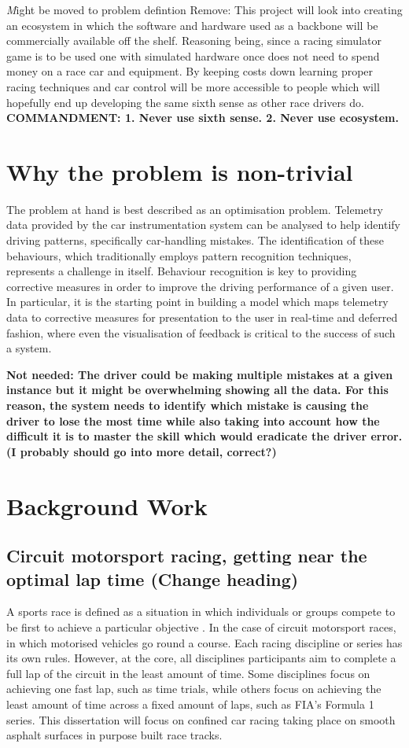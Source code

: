 \documentclass{article}
\begin{document}
\emph Might be moved to problem defintion {Remove: This project will look into creating an ecosystem in which the software and hardware used as a backbone will be commercially available off the shelf. Reasoning being, since a racing simulator game is to be used one with simulated hardware once does not need to spend money on a race car and equipment. By keeping costs down learning proper racing techniques and car control will be more accessible to people which will hopefully end up developing the same sixth sense as other race drivers do.} \textbf{COMMANDMENT: 1. Never use sixth sense. 2. Never use ecosystem.}

\section{Why the problem is non-trivial}
The problem at hand is best described as an optimisation problem. Telemetry data provided by the car instrumentation system can be analysed to help identify driving patterns, specifically car-handling mistakes. The identification of these behaviours, which traditionally employs pattern recognition techniques, represents a challenge in itself. Behaviour recognition is key to providing corrective measures in order to improve the driving performance of a given user. In particular, it is the starting point in building a model which maps telemetry data to corrective measures for presentation to the user in real-time and deferred fashion, where even the visualisation of feedback is critical to the success of such a system. 

\textbf{Not needed: The driver could be making multiple mistakes at a given instance but it might be overwhelming showing all the data. For this reason, the system needs to identify which mistake is causing the driver to lose the most time while also taking into account how the difficult it is to master the skill which would eradicate the driver error. (I probably should go into more detail, correct?)}

\section{Background Work}

\subsection{Circuit motorsport racing, getting near the optimal lap time (Change heading)}

A sports race is defined as a situation in which individuals or groups compete to be first to achieve a particular objective \cite{mycitationsuckscock}. In the case of circuit motorsport races, in which motorised vehicles go round a course. Each racing discipline or series has its own rules. However, at the core, all disciplines participants aim to complete a full lap of the circuit in the least amount of time. Some disciplines focus on achieving one fast lap, such as time trials, while others focus on achieving the least amount of time across a fixed amount of laps, such as FIA's Formula 1 series. This dissertation will focus on confined car racing taking place on smooth asphalt surfaces in purpose built race tracks. 
\end{document}
